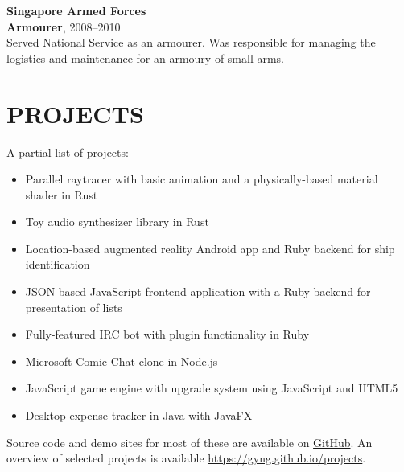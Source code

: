 \documentclass[line, margin]{res}
\begin{document}
\begin{resume}
        \textbf{Singapore Armed Forces} \\
        \textbf{Armourer}, 2008--2010 \\
        Served National Service as an armourer. Was responsible for managing the logistics and maintenance for an armoury of small arms.

    \section{PROJECTS}
        A partial list of projects: \\
        \begin{itemize}[leftmargin=*]
        \item Parallel raytracer with basic animation and a physically-based material shader in Rust
        \item Toy audio synthesizer library in Rust
        \item Location-based augmented reality Android app and Ruby backend for ship identification
        \item \textsc{JSON}-based JavaScript frontend application with a Ruby backend for presentation of lists
        \item \textsc Fully-featured IRC bot with plugin functionality in Ruby
        \item Microsoft Comic Chat clone in Node.js
        \item JavaScript game engine with upgrade system using JavaScript and HTML5
        \item Desktop expense tracker in Java with JavaFX
        \end{itemize}

        Source code and demo sites for most of these are available on \href{http://github.com/gyng}{GitHub}. An overview of selected projects is available \href{https://gyng.github.io/projects}{https://gyng.github.io/projects}.

\end{resume}
\end{document}
